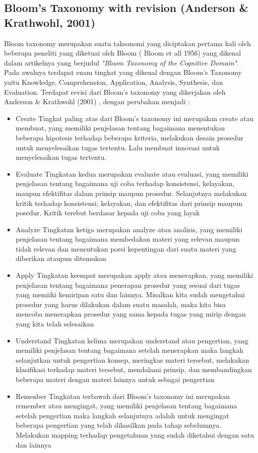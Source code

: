	\subsection{Bloom’s Taxonomy with revision (Anderson \& Krathwohl, 2001)}
	Bloom taxonomy merupakan suatu taksonomi yang diciptakan pertama kali oleh beberapa peneliti yang diketuai oleh Bloom ( Bloom et all 1956) yang dikenal dalam artikelnya yang berjudul \textit{"Bloom Taxonomy of the Cognitive Domain"}. Pada awalnya terdapat enam tingkat yang dikenal dengan Bloom’s Taxonomy yaitu Knowledge, Comprehension, Application, Analysis, Synthesis, dan Evaluation. 
	\linebreak \linebreak
	Terdapat revisi dari Bloom’s taxonomy yang dikerjakan oleh Anderson \& Krathwohl (2001) , dengan perubahan menjadi :
	\begin{itemize}
		\item Create
			\subitem Tingkat paling atas dari Bloom’s taxonomy ini merupakan create atau membuat, yang memiliki penjelasan tentang bagaimana menentukan beberapa hipotesis terhadap beberapa kriteria, melakukan desain prosedur untuk menyelesaikan tugas tertentu. Lalu membuat innovasi untuk menyelesaikan tugas tertentu.
		\item Evaluate
			\subitem Tingkatan kedua merupakan evaluate atau evaluasi, yang memiliki penjelasan tentang bagaimana uji coba terhadap konsistensi, kelayakan, maupun efektifitas dalam prinsip maupun prosedur. Selanjutnya melakukan kritik terhadap konsistensi, kelayakan, dan efektifitas dari prinsip maupun posedur. Kritik terebut berdasar kepada uji coba yang layak
		\item Analyze
			\subitem Tingkatan ketiga merupakan analyze atau analisis, yang memiliki penjelasan tentang bagaimana membedakan materi yang relevan maupun tidak relevan dan menentukan porsi kepentingan dari suatu materi yang diberikan ataupun ditemukan
		\item Apply
			\subitem Tingkatan keempat merupakan apply atau menerapkan, yang memiliki penjelasan tentang bagaimana penerapan prosedur yang sesuai dari tugas yang memiiki kemiripan satu dan lainnya. Misalkan kita sudah mengetahui prosedur yang harus dilakukan dalam suatu masalah, maka kita bisa mencoba menerapkan prosedur yang sama kepada tugas yang mirip dengan yang kita telah selesaikan
		\item Understand
			\subitem Tingkatan kelima merupakan understand atau pengertian, yang memiliki penjelasan tentang bagaimana setelah menerapkan maka langkah selanjutkan untuk pengertian konsep, meringkas materi tersebut, melakukan klasifikasi terhadap materi tersebut, mendalami prinsip, dan membandingkan beberapa materi dengan materi lainnya untuk sebagai pengertian
		\item Remenber
			\subitem Tingkatan terbawah dari Bloom’s taxonomy ini merupakan remember atau mengingat, yang memiliki penjelasan tentang bagaimana setelah pengertian maka langkah selanjutnya adalah untuk mengingat beberapa pengertian yang telah dihasilkan pada tahap sebelumnya. Melakukan mapping terhadap pengetahuan yang sudah diketahui dengan satu dan lainnya
		
	\end{itemize}
